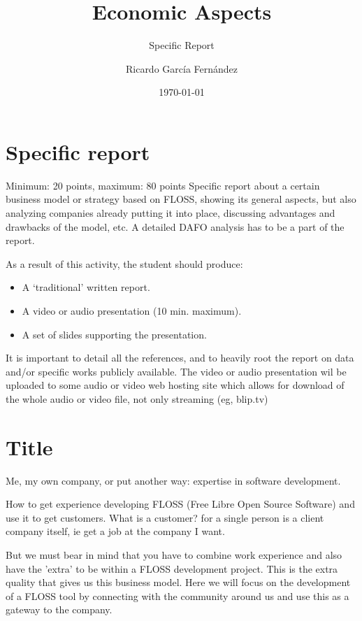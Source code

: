 \documentclass[11pt]{scrartcl}
\title{\textbf{Economic Aspects\\}}
\subtitle{Specific Report}
\author{Ricardo Garc\'ia Fern\'andez}
\date{\today}
\begin{document}
\maketitle

\section{Specific report}

Minimum: 20 points, maximum: 80 points
Specific report about a certain business model or strategy based on FLOSS, showing its general aspects, but also analyzing companies already putting it into place, discussing advantages and drawbacks of the model, etc. A detailed DAFO analysis has to be a part of the report.

As a result of this activity, the student should produce:
\begin{itemize}
    \item A ‘traditional’ written report.
    \item A video or audio presentation (10 min. maximum).
    \item A set of slides supporting the presentation.
\end{itemize}

It is important to detail all the references, and to heavily root the report on data and/or specific works publicly available. The video or audio presentation wil be uploaded to some audio or video web hosting site which allows for download of the whole audio or video file, not only streaming (eg, blip.tv)

\section{Title}

\par Me, my own company, or put another way: expertise in software development.

\par How to get experience developing FLOSS (Free Libre Open Source Software) and use it to get customers. What is a customer? for a single person is a client company itself, ie get a job at the company I want.

\par But we must bear in mind that you have to combine work experience and also have the 'extra' to be within a FLOSS development project. This is the extra quality that gives us this business model. Here we will focus on the development of a FLOSS tool by connecting with the community around us and use this as a gateway to the company.
\end{document}
